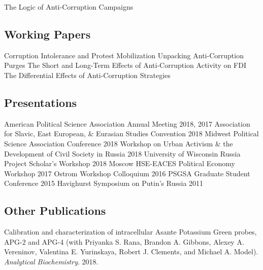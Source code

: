 \documentclass[11pt,]{article}
\begin{document}
\vspace{-2mm}

The Logic of Anti-Corruption Campaigns

\vspace{-2mm}

\hypertarget{working-papers}{%
\subsection{Working Papers}\label{working-papers}}

\vspace{-2mm}

Corruption Intolerance and Protest Mobilization \hfill \break Unpacking
Anti-Corruption Purges \hfill \break The Short and Long-Term Effects of
Anti-Corruption Activity on FDI \hfill \break The Differential Effects
of Anti-Corruption Strategies

\vspace{-3mm}

\hypertarget{presentations}{%
\subsection{Presentations}\label{presentations}}

\vspace{-2mm}

American Political Science Association Annual Meeting \hfill 2018, 2017
\break Association for Slavic, East European, \& Eurasian Studies
Convention \hfill 2018 \break Midwest Political Science Association
Conference \hfill 2018 \break Workshop on Urban Activism \& the
Development of Civil Society in Russia \hfill 2018 \break University of
Wisconsin Russia Project Scholar's Workshop \hfill 2018 \break Moscow
HSE-EACES Political Economy Workshop \hfill 2017 \break Ostrom Workshop
Colloquium \hfill 2016 \break PSGSA Graduate Student Conference
\hfill 2015 \break Havighurst Symposium on Putin's Russia \hfill 2011
\break

\vspace{-7mm}

\hypertarget{other-publications}{%
\subsection{Other Publications}\label{other-publications}}

\vspace{-2mm}

Calibration and characterization of intracellular Asante Potassium Green
probes, APG-2 and APG-4 (with Priyanka S. Rana, Brandon A. Gibbons,
Alexey A. Vereninov, Valentina E. Yurinskaya, Robert J. Clements, and
Michael A. Model). \emph{Analytical Biochemistry}. 2018.
\end{document}
